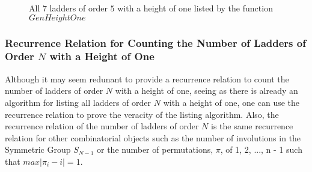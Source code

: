 \begin{figure}[!htp]
\begin{center}
        \end{center}
        \caption{All $7$ ladders of order $5$ with a height of one listed by the function $GenHeightOne$}
   \end{figure}

   \subsubsection{Recurrence Relation for Counting the Number of Ladders of Order $N$ with a Height of One}
   Although it may seem redunant to provide a recurrence relation to count the number of ladders of order $N$ with a height of one, seeing as 
   there is already an algorithm for listing all ladders of order $N$ with a height of one, one can use the recurrence relation to prove the 
   veracity of the listing algorithm. Also, the recurrence relation of the number of ladders of order $N$ is the same recurrence relation for 
   other combinatorial objects such as the number of involutions in the Symmetric Group $S_{N-1}$ or the number of permutations, $\pi$, of {1, 2, ..., n - 1} 
   such that $max|\pi_{i} - i| = 1$.\par 
   
